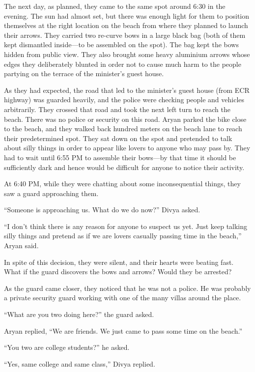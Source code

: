 The next day, as planned, they came to the same spot around 6:30 in the evening.
The sun had almost set, but there was enough light for them to position
themselves at the right location on the beach from where they planned to launch
their arrows. They carried two re-curve bows in a large black bag (both of them
kept dismantled inside—to be assembled on the spot). The bag kept the bows
hidden from public view. They also brought some heavy aluminium arrows whose
edges they deliberately blunted in order not to cause much harm to the people
partying on the terrace of the minister's guest house.

As they had expected, the road that led to the minister's guest house (from ECR
highway) was guarded heavily, and the police were checking people and vehicles
arbitrarily. They crossed that road and took the next left turn to reach the
beach. There was no police or security on this road. Aryan parked the bike close
to the beach, and they walked back hundred meters on the beach lane to reach
their predetermined spot. They sat down on the spot and pretended to talk about
silly things in order to appear like lovers to anyone who may pass by. They had
to wait until 6:55 PM to assemble their bows—by that time it should be
sufficiently dark and hence would be difficult for anyone to notice their
activity.

At 6:40 PM, while they were chatting about some inconsequential things, they saw
a guard approaching them.

“Someone is approaching us. What do we do now?” Divya asked.

“I don't think there is any reason for anyone to suspect us yet. Just keep
talking silly things and pretend as if we are lovers casually passing time in
the beach,” Aryan said.

In spite of this decision, they were silent, and their hearts were beating fast.
What if the guard discovers the bows and arrows? Would they be arrested?

As the guard came closer, they noticed that he was not a police. He was probably
a private security guard working with one of the many villas around the place.

“What are you two doing here?” the guard asked.

Aryan replied, “We are friends. We just came to pass some time on the beach.”

“You two are college students?” he asked.

“Yes, same college and same class,” Divya replied.

